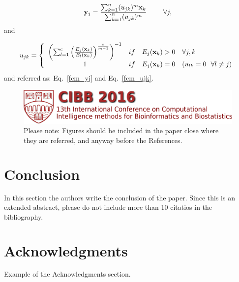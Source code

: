 \documentclass[12pt,a4paper]{cibb}
\begin{document}
\begin{equation}
{\bf y}_{j} = \frac {\sum_{k=1}^{n} (u_{jk})^{m}{\bf x}_{k} }{
\sum_{k=1}^{n} ({ u}_{jk})^{m} } \, \, \ \mbox{\hspace{.5cm}  } \forall j,
\label{fcm_yj}
\end{equation}
and

\begin{equation}
u_{jk} =
\left\{
\begin{array}{clll}
\left( \sum_{l=1}^{c} \left( \frac {E_{j}({\bf x}_{k})}{E_{l}({\bf x}_{k})}
\right)^\frac{2}{m-1} \right)^{-1} & if & E_{j}({\bf x}_{k})>0 & \forall j,k \\
1 & if & E_{j}({\bf x}_{k})=0 & (u_{lk}=0 \ \ \forall l \neq j) \\
\end{array}
\right.
\label{fcm_ujk}
\end{equation}
and referred as: Eq.~\ref{fcm_yj} and Eq.~\ref{fcm_ujk}.

\begin{figure}[h]
\vspace{3mm}
 \begin{center}
 \includegraphics[width=12cm]{cibb-logo2016.png}
\caption {Please note: Figures should be
included in the paper close where they are referred, and anyway before the
References.\label{cibb-fig}}
 \end{center}
\vspace{-8mm}
\end{figure}

\section{\bf Conclusion}

In this section the authors write the conclusion of the paper. Since this is an extended abstract, please do not include more than 10 citatios in the bibliography.

\section*{\bf Acknowledgments}

Example of the Acknowledgments section.
\end{document}
